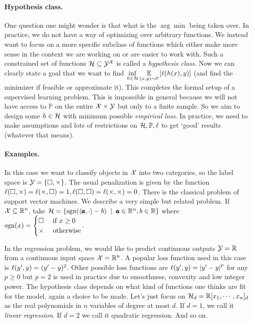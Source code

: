 \paragraph{Hypothesis class.} One question one might wonder is that what is the $\arg\min$ being taken over. In practice, we do not have a way of optimizing over arbitrary functions. We instead want to focus on a more specific subclass of functions which either make more sense in the context we are working on or are easier to work with. Such a constrained set of functions ${\mathcal{H}} \subseteq {\mathcal{Y}}^{{\mathcal{X}}}$ is called a \textit{hypothesis class}. Now we can clearly state a goal that we want to find $\displaystyle\inf_{h\in{\mathcal{H}}} \underset{(x,y)\sim\mathbb P}{\mathbb E} \left[\ell(h(x),y)\right]$ (and find the minimizer if feasible or approximate it). This completes the formal setup of a supervised learning problem. This is impossible in general because we will not have access to $\mathbb P$ on the entire ${\mathcal{X}}\times {\mathcal{Y}}$ but only to a finite sample. So we aim to design some $h\in {\mathcal{H}}$ with minimum possible \textit{empirical loss}. In practice, we need to make assumptions and lots of restrictions on ${\mathcal{H}},\mathbb P, \ell$ to get `good' results (whatever that means).

\paragraph{Examples.}
\begin{ex}
In this case we want to classify objects in ${\mathcal{X}}$ into two categories, so the label space is ${\mathcal{Y}}=\left\{\square, \times\right\}$. The usual penalization is given by the function $\ell(\square, \times) = \ell(\times,\square) = 1, \ell(\square,\square)=\ell(\times,\times)=0$. There is the classical problem of support vector machines. We describe a very simple but related problem. If ${\mathcal{X}}\subseteq \mathbb{R}^{n}$, take $\cH=\set{\sgn(\inner{\pmb a}{\cdot} - b)\st \pmb a\in\R^{n}, b\in \R}$ where $\operatorname{sgn}(x) = \begin{cases}
\square & \text{ if } x\ge 0\\
\times & \text{ otherwise}
\end{cases}$. 
\end{ex}

\begin{ex}[Regression]
In the regression problem, we would like to predict continuous outputs ${\mathcal{Y}}=\mathbb{R}$ from a continuous input space ${\mathcal{X}} = \mathbb{R}^{n}$. A popular loss function used in this case is $\ell(y',y) = (y'-y)^{2}$. Other possible loss functions are $\ell(y',y)=\left| y'-y \right|^{p}$ for any $p\ge 0$ but $p=2$ is used in practice due to smoothness, convexity and low integer power. The hypothesis class depends on what kind of functions one thinks are fit for the model, again a choice to be made. Let's just focus on ${\mathcal{H}}_{d} = \mathbb{R}[x_{1},\cdots,x_{n}]_{d}$ as the real polynomials in $n$ variables of degree at most $d$. If $d=1$, we call it \textit{linear regression}. If $d=2$ we call it quadratic regression. And so on.
\end{ex}

